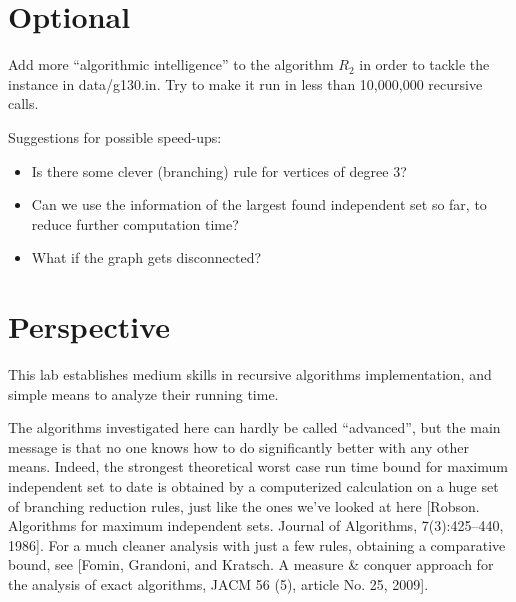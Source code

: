 \documentclass{tufte-handout}
\begin{document}
    \newpage

\section{Optional}
Add more ``algorithmic intelligence'' to the algorithm $R_2$ in order to tackle the instance in data/g130.in.
Try to make it run in less than 10,000,000 recursive calls. 

Suggestions for possible speed-ups:
\begin{itemize}
\item Is there some clever (branching) rule for vertices of degree 3?
\item Can we use the information of the largest found independent set so far, to reduce further computation time?
\item What if the graph gets disconnected?
\end{itemize}

\newpage
\section{ Perspective}

This lab establishes medium skills in recursive algorithms implementation,
and simple means to analyze their running time.

\bigskip

The algorithms investigated here can hardly be called ``advanced'', but the main message 
is that no one knows how to do significantly better with any other means.
Indeed, the strongest theoretical worst case run time bound for maximum independent set to date
is obtained by a computerized calculation on a huge set of branching reduction rules, just like the ones we've looked at here [Robson. Algorithms for maximum independent sets. Journal of Algorithms, 7(3):425--440, 1986]. For a much cleaner analysis with just a few rules, obtaining a comparative bound, see [Fomin, Grandoni, and Kratsch. A measure \& conquer approach for the analysis of exact algorithms, JACM 56 (5), article No. 25, 2009].
\end{document}

